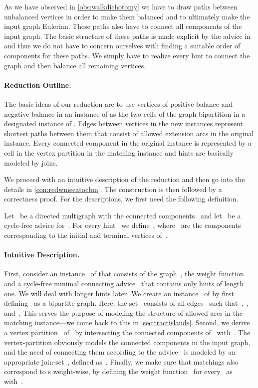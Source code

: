 As we have observed in \autoref{obs:walkdichotomy} we have to draw paths between unbalanced vertices in order to make them balanced and to ultimately make the input graph Eulerian. These paths also have to connect all components of the input graph. The basic structure of these paths is made explicit by the advice in \pWMEECCLAs{} and thus we do not have to concern ourselves with finding a suitable order of components for these paths. We simply have to realize every hint to connect the graph and then balance all remaining vertices.

\paragraph{Reduction Outline.}
The basic ideas of our reduction are to use vertices of positive balance and negative balance in an instance of \pWMEECCLAs{} as the two cells of the graph bipartition in a designated instance of \pCBMs{}. Edges between vertices in the new instances represent shortest paths between them that consist of allowed extension arcs in the original instance. Every connected component in the original instance is represented by a cell in the vertex partition in the matching instance and hints are basically modeled by joins.

We proceed with an intuitive description of the reduction and then go into the details in \autoref{con:redwmeeatocbm}. The construction is then followed by a correctness proof. For the descriptions, we first need the following definition.
\begin{definition}
  Let~ be a directed multigraph with the connected components~ and let~ be a cycle-free advice for~. For every hint~ we define~, where~ are the components corresponding to the initial and terminal vertices of~.
\end{definition}
\paragraph{Intuitive Description.}
First, consider an instance~ of \pWMEECCLAs{} that consists of the graph~, the weight function~ and a cycle-free minimal connecting advice~ that contains only hints of length one. We will deal with longer hints later. We create an instance~ of \pCBMs{} by first defining~ as a bipartite graph. Here, the set~ consists of all edges~ such that~,~, and~. This serves the purpose of modeling the structure of allowed arcs in the matching instance---we come back to this in \autoref{sec:tractislands}. Second, we derive a vertex partition~ of~ by intersecting the connected components of~ with~. The vertex-partition obviously models the connected components in the input graph, and the need of connecting them according to the advice~ is modeled by an appropriate join-set~, defined as~. Finally, we make sure that matchings also correspond to \EE s weight-wise, by defining the weight function~ for every~ as~ with~.

